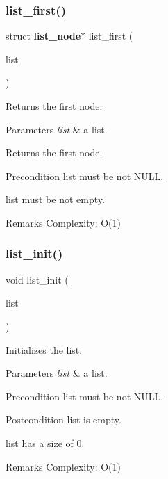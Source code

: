 \subsubsection{list\+\_\+first()}
{\footnotesize\ttfamily struct \textbf{ list\+\_\+node}$\ast$ list\+\_\+first (\begin{DoxyParamCaption}\item[{const struct \textbf{ list} $\ast$}]{list }\end{DoxyParamCaption})}

Returns the first node.


\begin{DoxyParams}{Parameters}
{\em list} & a list. \\
\hline
\end{DoxyParams}
\begin{DoxyReturn}{Returns}
the first node.
\end{DoxyReturn}
\begin{DoxyPrecond}{Precondition}
{\ttfamily list} must be not N\+U\+LL. 

{\ttfamily list} must be not empty.
\end{DoxyPrecond}
\begin{DoxyRemark}{Remarks}
Complexity\+: O(1) 
\end{DoxyRemark}
\mbox{\label{list_8c_a8aa862d10f52f7b0348fce990c7c12db}} 
\subsubsection{list\+\_\+init()}
{\footnotesize\ttfamily void list\+\_\+init (\begin{DoxyParamCaption}\item[{struct \textbf{ list} $\ast$}]{list }\end{DoxyParamCaption})\hspace{0.3cm}{\ttfamily [inline]}}

Initializes the list.


\begin{DoxyParams}{Parameters}
{\em list} & a list.\\
\hline
\end{DoxyParams}
\begin{DoxyPrecond}{Precondition}
{\ttfamily list} must be not N\+U\+LL.
\end{DoxyPrecond}
\begin{DoxyPostcond}{Postcondition}
{\ttfamily list} is empty. 

{\ttfamily list} has a size of 0.
\end{DoxyPostcond}
\begin{DoxyRemark}{Remarks}
Complexity\+: O(1) 
\end{DoxyRemark}
\mbox{\label{list_8c_aac5b9656592776dd99c192c7c8f2b18f}} 
